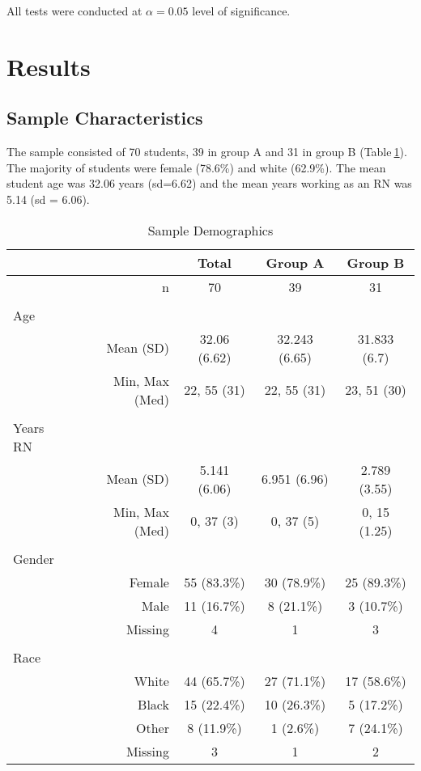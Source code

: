 \documentclass[]{article}
\begin{document}
All tests were conducted at \(\alpha = 0.05\) level of significance.

\section{Results}\label{results}

\subsection{Sample Characteristics}\label{sample-characteristics}

The sample consisted of 70 students, 39 in group A and 31 in group B
(Table\(~\)\ref{tab:demo}). The majority of students were female
(78.6\%) and white (62.9\%). The mean student age was 32.06 years
(sd=6.62) and the mean years working as an RN was 5.14 (sd = 6.06).

\begin{table}[hbt]
\centering
\caption{Sample Demographics}
\begin{tabular}{l r | c c c}
&& Total & Group A & Group B\\
\hline
& n & 70 & 39 & 31\\
&&\\
Age && \\
& Mean (SD)
  & 32.06 (6.62) 
  & 32.243 (6.65)
  & 31.833 (6.7) \\
& Min, Max (Med)
  & 22, 55 (31) 
  & 22, 55 (31)
  & 23, 51 (30) \\
&& \\
Years RN &&\\
& Mean (SD)
  & 5.141 (6.06) 
  & 6.951 (6.96)
  & 2.789 (3.55) \\
& Min, Max (Med)
  & 0, 37 (3) 
  & 0, 37 (5)
  & 0, 15 (1.25) \\
&& \\
Gender &&\\
& Female 
  & 55 (83.3\%)
  & 30 (78.9\%)
  & 25 (89.3\%)\\
& Male 
  & 11 (16.7\%)
  & 8 (21.1\%)
  & 3 (10.7\%)\\
& Missing
  & 4
  & 1
  & 3\\
&&\\
Race &&\\
& White
  & 44 (65.7\%)
  & 27 (71.1\%)
  & 17 (58.6\%)\\
& Black
  & 15 (22.4\%)
  & 10 (26.3\%)
  & 5 (17.2\%)\\
& Other
  & 8 (11.9\%)
  & 1 (2.6\%)
  & 7 (24.1\%)\\
& Missing
  & 3
  & 1
  & 2\\
\end{tabular}
    
\label{tab:demo}
\end{table}
\end{document}
